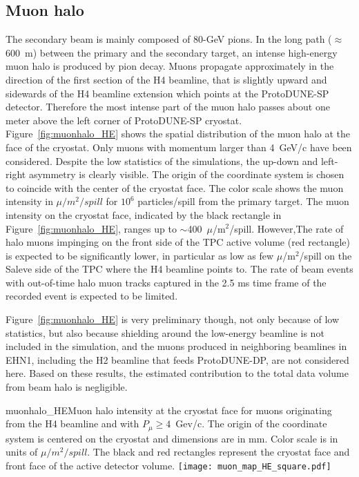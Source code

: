 \subsection{Muon halo}
The secondary beam is mainly composed of 80-GeV pions. In the long path ($\approx$ 600~m) between the primary and the secondary target,
 an intense high-energy muon halo is produced by pion decay. Muons propagate approximately in the direction of the first section of the H4 beamline,  that is slightly upward  and sidewards of the H4 beamline extension which points at the ProtoDUNE-SP detector.  
 Therefore the most intense part of the muon halo passes about one meter above the left corner of ProtoDUNE-SP cryostat. 
Figure~\ref{fig:muonhalo_HE} shows the spatial distribution of the muon halo at the face of the cryostat. Only muons with momentum larger than 4~GeV/c have been considered. Despite the low statistics of the simulations, the up-down and left-right asymmetry is clearly visible. The origin of the coordinate system is chosen to coincide with the center of the cryostat face. The color scale shows the muon intensity in $\mu /m^2/spill$ for $10^6$ particles/spill from the primary target. The muon intensity on the cryostat face, indicated by the black rectangle in Figure~\ref{fig:muonhalo_HE}, ranges up to $\sim$400~$\mu$/m$^2$/spill. However,The rate of halo muons impinging on the front side of the TPC active volume (red rectangle) is expected to be significantly lower, in particular as low as few $\mu$/m$^2$/spill on the Saleve side of the TPC 
where the H4 beamline points to. The rate of beam events with out-of-time halo muon tracks captured in the 2.5 ms time frame of the recorded event is expected to be limited.

Figure~\ref{fig:muonhalo_HE}  is very preliminary though, not only because of low statistics, but also because shielding around the low-energy beamline is not included in the simulation, and the muons produced in neighboring beamlines in EHN1, including the H2 beamline that feeds ProtoDUNE-DP, are not considered here. Based on these results, the estimated contribution to the total data volume from beam halo is negligible.
\begin{cdrfigure}{muonhalo_HE}{Muon halo intensity at the cryostat face for muons originating from the H4 beamline and with $P_\mu  \ge 4$~Gev/c. The origin of the coordinate system is centered on the cryostat and dimensions are in mm. Color scale is in units of $\mu /m^2/spill$. The black and red rectangles represent the cryostat face and front face of the active detector volume.}
\texttt{[image: muon\_map\_HE\_square.pdf]}
\end{cdrfigure}
